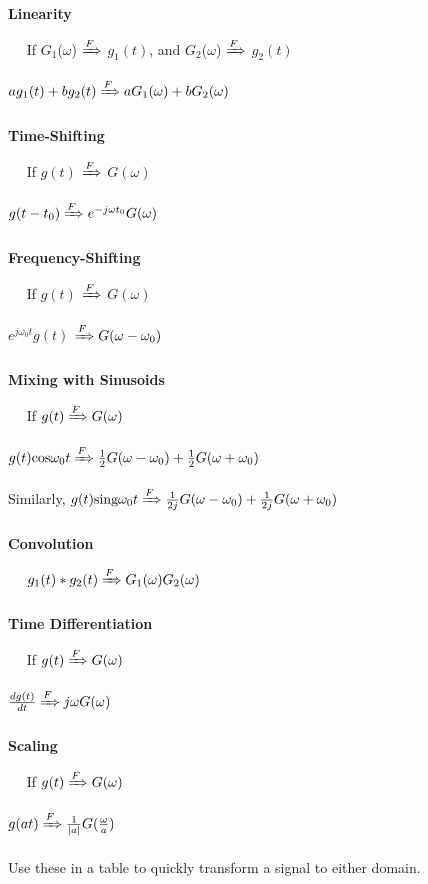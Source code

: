 \documentclass[11pt]{article}
\DeclarePairedDelimiter{\abs}{\lvert}{\rvert}
\begin{document}
\textbf{Linearity} 
\hfill \break \par $\quad$ If $G_1$($\omega$) $\xRightarrow{F}$ $g_1(t)$, and $G_2$($\omega$) $\xRightarrow{F}$ $g_2(t)$ \par 
\quad $ag_1(t) + bg_2(t) \xRightarrow{F} aG_1(\omega) + bG_2(\omega)$ \\ \\
\textbf{Time-Shifting} 
\hfill \break \par $\quad$ If $g(t)$ $\xRightarrow{F}$ $G(\omega)$ 
\par \quad $g(t-t_0) \xRightarrow{F} e^{-j\omega t_0}G(\omega)$ \\ \\ 
\textbf{Frequency-Shifting} 
\hfill \break \par $\quad$ If $g(t)$ $\xRightarrow{F}$ $G(\omega)$ 
\par \quad $e^{j\omega_0t} g(t)$ $\xRightarrow{F} G(\omega - \omega_0)$  \\ \\
\textbf{Mixing with Sinusoids} 
\hfill \break \par $\quad$ 
If $g(t) \xRightarrow{F} G(\omega)$
\par \quad
$g(t)\text{cos}\omega_0t \xRightarrow{F} \frac{1}{2}G(\omega - \omega_0) + \frac{1}{2}G(\omega + \omega_0)$
\par \quad
Similarly, $g(t)\text{sing}\omega_0t \xRightarrow{F} \frac{1}{2j}G(\omega - \omega_0) + \frac{1}{2j}G(\omega + \omega_0)$ 
\\ \\
\textbf{Convolution}
\hfill \break \par $\quad$ 
$g_1(t) * g_2(t) \xRightarrow{F} G_1(\omega)G_2(\omega)$
\\ \\
\textbf{Time Differentiation}
\hfill \break \par $\quad$
If $g(t) \xRightarrow{F} G(\omega)$
\par \quad
$\frac{dg(t)}{dt} \xRightarrow{F} j\omega G(\omega)$ \\ \\ 
\textbf{Scaling}
\hfill \break \par $\quad$ 
If $g(t) \xRightarrow{F} G(\omega)$
\par \quad
$g(at) \xRightarrow{F} \frac{1}{\abs{a}}G(\frac{\omega}{a})$
\\ \\
Use these in a table to quickly transform a signal to either domain.
\end{document}
